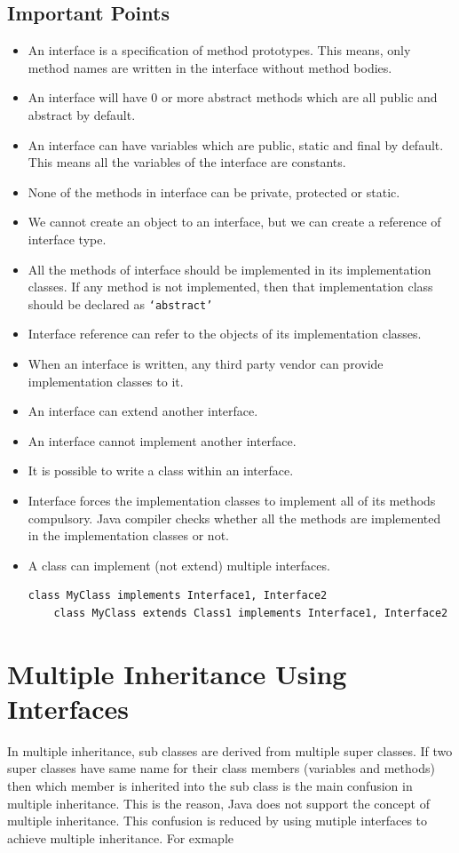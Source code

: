 \documentclass[11pt,a4paper]{article}
\begin{document}
\subsection*{Important Points}
\begin{itemize}
\item An interface is a specification of method prototypes. This means, only method names are written in the interface without method bodies.
\item An interface will have 0 or more abstract methods which are all public and abstract by default.
\item An interface can have variables which are public, static and final by default. This means all the variables of the interface are constants.
\item None of the methods in interface can be private, protected or static. 
\item We cannot create an object to an interface, but we can create a reference of interface type.
\item All the methods of interface should be implemented in its implementation classes. If any method is not implemented, then that implementation class should be declared as \texttt{`abstract'}
\item Interface reference can refer to the objects of its implementation classes.
\item When an interface is written, any third party vendor can provide implementation classes to it.
\item An interface can extend another interface.
\item An interface cannot implement another interface.
\item It is possible to write a class within an interface.
\item Interface forces the implementation classes to implement all of its methods compulsory. Java compiler checks whether all the methods are implemented in the implementation classes or not.
\item A class can implement (not extend) multiple interfaces. 
\begin{lstlisting}[numbers=none]
    class MyClass implements Interface1, Interface2 
    class MyClass extends Class1 implements Interface1, Interface2
\end{lstlisting}
\end{itemize}
\section*{Multiple Inheritance Using Interfaces}
In multiple inheritance, sub classes are derived from multiple super classes. If two super classes have same name for their class members (variables and methods) then which member is inherited into the sub class is the main confusion in multiple inheritance. This is the reason, Java does not support the concept of multiple inheritance. This confusion is reduced by using mutiple interfaces to achieve multiple inheritance. For exmaple
\end{document}
